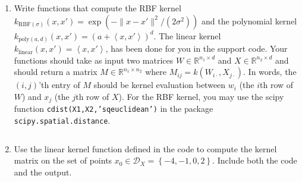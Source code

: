 \documentclass{article}
\theoremstyle{plain}
\theoremstyle{definition}
\begin{document}
\begin{enumerate}
  \setcounter{enumi}{\value{saveenum}}
\item Write functions that compute the RBF kernel $k_{\text{RBF}(\sigma)}(x,x')=\exp\left(-\|x-x'\|^{2}/\left(2\sigma^{2}\right)\right)$
and the polynomial kernel $k_{\text{poly}(a,d)}(x,x')=\left(a+\left\langle x,x'\right\rangle \right)^{d}$.
The linear kernel $k_{\text{linear}}(x,x')=\left\langle x,x'\right\rangle $,
has been done for you in the support code. Your functions should take
as input two matrices $W\in\mathbb{R}^{n_{1}\times d}$ and $X\in\mathbb{R}^{n_{2}\times d}$
and should return a matrix $M\in\mathbb{R}^{n_{1}\times n_{2}}$ where
$M_{ij}=k(W_{i\cdot},X_{j\cdot})$. In words, the $(i,j)$'th entry
of $M$ should be kernel evaluation between $w_{i}$ (the $i$th row
of $W$) and $x_{j}$ (the $j$th row of $X$).
For the RBF kernel, you may use the scipy function \texttt{cdist(X1,X2,'sqeuclidean')}
in the package \texttt{scipy.spatial.distance}. 
\begin{itemize}
    \color{blue}
      \inputminted[firstline=1110, lastline=1136, breaklines=True]{python}{hw_3.py}
\end{itemize}


\item Use the linear kernel function defined in the code to compute the
kernel matrix on the set of points $x_{0}\in\mathcal{D}_{X}=\left\{ -4,-1,0,2\right\} $.
Include both the code and the output. 

\begin{itemize}

      \inputminted[firstline=433, lastline=434, breaklines=True]{python}{hw_3.py}


\end{itemize}
\end{enumerate}
\end{document}
